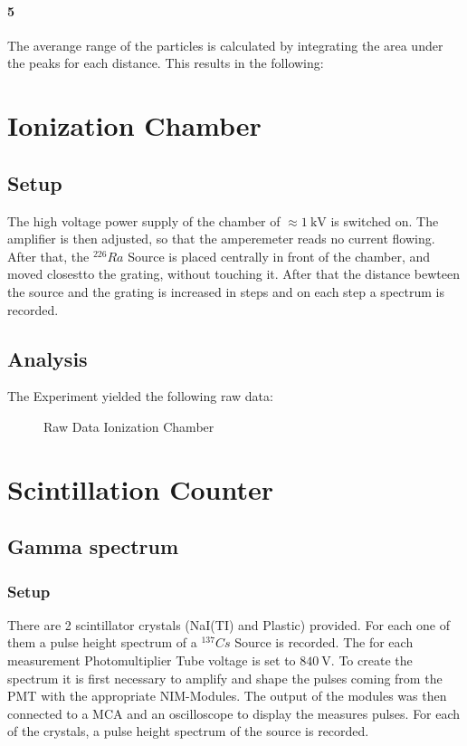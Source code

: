 \documentclass[12pt,twoside,a4paper]{scrartcl}
\begin{document}
			\paragraph{5}
				The averange range of the particles is calculated by integrating the area under the peaks for each distance.
				This results in the following:

\section{Ionization Chamber}

	\subsection{Setup}
		 The high voltage power supply of the chamber of $\approx \SI{1}{\kilo \volt}$ is switched on. The amplifier is then adjusted, so that the amperemeter reads no current flowing. After that, the $^{226}Ra$ Source is placed centrally in front of the chamber, and moved closestto the grating, without touching it. After that the distance bewteen the source and the grating is increased in steps and on each step a spectrum is recorded.

	\subsection{Analysis}

		The Experiment yielded the following raw data:

		\begin{figure}[H]
			\caption{Raw Data Ionization Chamber}
		\end{figure}


\section{Scintillation Counter}
	\subsection{Gamma spectrum}
	\label{Gamma}
		\subsubsection{Setup}

		There are 2 scintillator crystals (NaI(TI) and Plastic) provided. For each one of them a pulse height spectrum of a $^{137}Cs$ Source is recorded. The for each measurement Photomultiplier Tube voltage is set to $\SI{840}{\volt}$. To create the spectrum it is first necessary to amplify and shape the pulses coming from the PMT with the appropriate NIM-Modules. The output of the modules was then connected to a MCA and an oscilloscope to display the measures pulses. For each of the crystals, a pulse height spectrum of the source is recorded.
\end{document}
